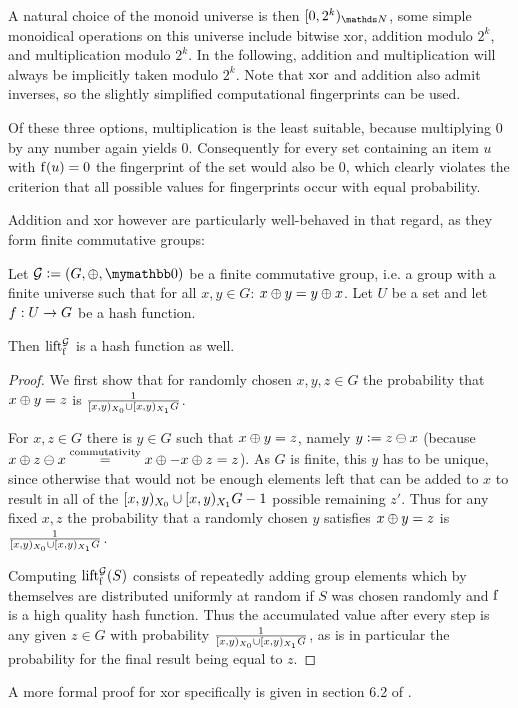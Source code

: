 A natural choice of the monoid universe is then $\interval{0}{2^k}{\N}$, some simple monoidical operations on this universe include bitwise xor, addition modulo $2^k$, and multiplication modulo $2^k$. In the following, addition and multiplication will always be implicitly taken modulo $2^k$. Note that $\operatorname{xor}$ and addition also admit inverses, so the slightly simplified computational fingerprints can be used.

Of these three options, multiplication is the least suitable, because multiplying $0$ by any number again yields $0$. Consequently for every set containing an item $u$ with $\operatorname{f}(u) = 0$ the fingerprint of the set would also be $0$, which clearly violates the criterion that all possible values for fingerprints occur with equal probability.

Addition and xor however are particularly well-behaved in that regard, as they form finite commutative groups:

\begin{proposition}
Let $\mathcal{G} \defeq (G, \groupaddsym, \neutraladd)$ be a finite commutative group, i.e. a group with a finite universe such that for all $x, y \in G$: ${x} \oplus {y} = {y} \oplus {x}$. Let $U$ be a set and let ${f}: {U} \rightarrow {G}$ be a hash function.

Then $\operatorname{lift_{\operatorname{f}}^{\mathcal{G}}}$ is a hash function as well.

\begin{proof}
We first show that for randomly chosen $x, y, z \in G$ the probability that ${x} \oplus {y} = z$ is $\frac{1}{[{x},{y})_{X_0} \cup [{x},{y})_{X_1}{G}}$.

For $x, z \in G$ there is $y \in G$ such that ${x} \oplus {y} = z$, namely $y \vcentcolon= {z} \ominus {x}$ (because ${x} \oplus {{z} \ominus {x}} \overset{\text{commutativity}}= {{x} \oplus {-{x}}} \oplus {z} = z$). As $G$ is finite, this $y$ has to be unique, since otherwise that would not be enough elements left that can be added to $x$ to result in all of the $[{x},{y})_{X_0} \cup [{x},{y})_{X_1}{G} - 1$ possible remaining $z'$. Thus for any fixed $x, z$ the probability that a randomly chosen $y$ satisfies ${x} \oplus {y} = z$ is $\frac{1}{[{x},{y})_{X_0} \cup [{x},{y})_{X_1}{G}}$.

Computing $\operatorname{lift_{\operatorname{f}}^{\mathcal{G}}}(S)$ consists of repeatedly adding group elements which by themselves are distributed uniformly at random if $S$ was chosen randomly and $\operatorname{f}$ is a high quality hash function. Thus the accumulated value after every step is any given $z \in G$ with probability $\frac{1}{[{x},{y})_{X_0} \cup [{x},{y})_{X_1}{G}}$, as is in particular the probability for the final result being equal to $z$.
\end{proof}

A more formal proof for xor specifically is given in section 6.2 of \cite{maziarz2021hashing}.
\end{proposition}

